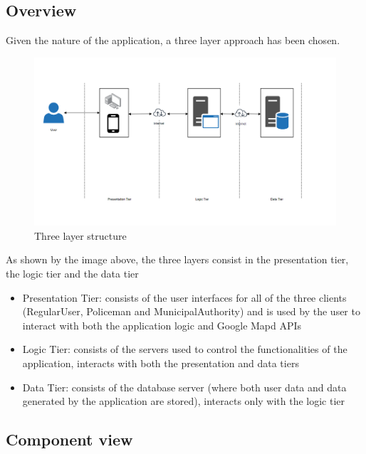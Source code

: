 \subsection{Overview}
Given the nature of the application, a three layer approach has been chosen.\newline
\begin{figure}[h!]
	\centering
	\includegraphics[width=\textwidth]{Images/three_layer}
	\caption{Three layer structure}
\end{figure}
\newline
As shown by the image above, the three layers consist in the presentation tier, the logic tier and the data tier
\begin{itemize}
\item Presentation Tier: consists of the user interfaces for all of the three clients (RegularUser, Policeman and MunicipalAuthority) and is used by the user to interact with both the application logic and Google Mapd APIs \newline
\item Logic Tier: consists of the servers used to control the functionalities of the application, interacts with both the presentation and data tiers \newline
\item Data Tier: consists of the database server (where both user data and data generated by the application are stored), interacts only with the logic tier \newline
\end{itemize}
\newpage
\subsection{Component view}
